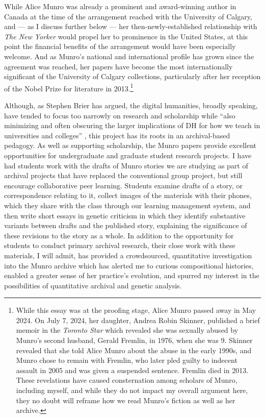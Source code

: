 \begin{paper}
\begin{quote}
\begin{flushright}
    \parencite[31]{sutherland_why_2022}
\end{flushright}
\end{quote}

While Alice Munro was already a prominent and award-winning author in
Canada at the time of the arrangement reached with the University of
Calgary, and –– as I discuss further below –– her then-newly-established
relationship with \emph{The New Yorker} would propel her to prominence
in the United States, at this point the financial benefits of the
arrangement would have been especially welcome. And as Munro's national
and international profile has grown since the agreement was reached, her
papers have become the most internationally significant of the
University of Calgary collections, particularly after her reception of
the Nobel Prize for literature in 2013.\footnote{While this essay was at the proofing stage, Alice Munro passed away in May 2024. On July 7, 2024, her daughter, Andrea Robin Skinner, published a brief memoir in the \emph{Toronto Star} which revealed she was sexually abused by Munro’s second husband, Gerald Fremlin, in 1976, when she was 9. Skinner revealed that she told Alice Munro about the abuse in the early 1990s, and Munro chose to remain with Fremlin, who later pled guilty to indecent assault in 2005 and was given a suspended sentence. Fremlin died in 2013. These revelations have caused consternation among scholars of Munro, including myself, and while they do not impact my overall argument here, they no doubt will reframe how we read Munro’s fiction as well as her archive.}

Although, as Stephen Brier has argued, the digital humanities, broadly
speaking, have tended to focus too narrowly on research and scholarship
while ``also minimizing and often obscuring the larger implications of
DH for how we teach in universities and colleges'' \citep[391]{brier_wheres_2012}, this
project has its roots in an archival-based pedagogy. As well as
supporting scholarship, the Munro papers provide excellent opportunities
for undergraduate and graduate student research projects. I have had
students work with the drafts of Munro stories we are studying as part
of archival projects that have replaced the conventional group project,
but still encourage collaborative peer learning. Students examine drafts
of a story, or correspondence relating to it, collect images of the
materials with their phones, which they share with the class through our
learning management system, and then write short essays in genetic
criticism in which they identify substantive variants between drafts
and the published story, explaining the significance of these revisions
to the story as a whole. In addition to the opportunity for students to
conduct primary archival research, their close work with these
materials, I will admit, has provided a crowdsourced, quantitative
investigation into the Munro archive which has alerted me to curious
compositional histories, enabled a greater sense of her practice's
evolution, and spurred my interest in the possibilities of quantitative
archival and genetic analysis.


\end{paper}
